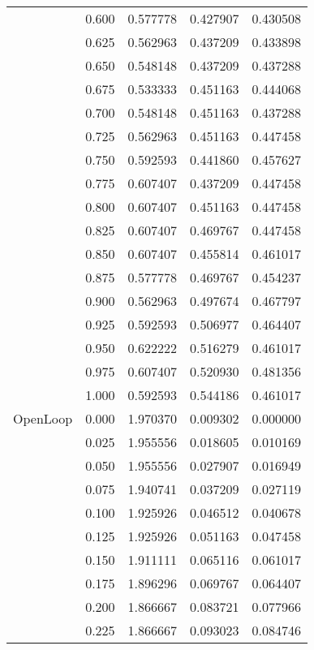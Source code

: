 \begin{tabular}{llrrr}
         & 0.600 &   0.577778 &   0.427907 &   0.430508 \\
         & 0.625 &   0.562963 &   0.437209 &   0.433898 \\
         & 0.650 &   0.548148 &   0.437209 &   0.437288 \\
         & 0.675 &   0.533333 &   0.451163 &   0.444068 \\
         & 0.700 &   0.548148 &   0.451163 &   0.437288 \\
         & 0.725 &   0.562963 &   0.451163 &   0.447458 \\
         & 0.750 &   0.592593 &   0.441860 &   0.457627 \\
         & 0.775 &   0.607407 &   0.437209 &   0.447458 \\
         & 0.800 &   0.607407 &   0.451163 &   0.447458 \\
         & 0.825 &   0.607407 &   0.469767 &   0.447458 \\
         & 0.850 &   0.607407 &   0.455814 &   0.461017 \\
         & 0.875 &   0.577778 &   0.469767 &   0.454237 \\
         & 0.900 &   0.562963 &   0.497674 &   0.467797 \\
         & 0.925 &   0.592593 &   0.506977 &   0.464407 \\
         & 0.950 &   0.622222 &   0.516279 &   0.461017 \\
         & 0.975 &   0.607407 &   0.520930 &   0.481356 \\
         & 1.000 &   0.592593 &   0.544186 &   0.461017 \\
OpenLoop & 0.000 &   1.970370 &   0.009302 &   0.000000 \\
         & 0.025 &   1.955556 &   0.018605 &   0.010169 \\
         & 0.050 &   1.955556 &   0.027907 &   0.016949 \\
         & 0.075 &   1.940741 &   0.037209 &   0.027119 \\
         & 0.100 &   1.925926 &   0.046512 &   0.040678 \\
         & 0.125 &   1.925926 &   0.051163 &   0.047458 \\
         & 0.150 &   1.911111 &   0.065116 &   0.061017 \\
         & 0.175 &   1.896296 &   0.069767 &   0.064407 \\
         & 0.200 &   1.866667 &   0.083721 &   0.077966 \\
         & 0.225 &   1.866667 &   0.093023 &   0.084746 \\

\end{tabular}
